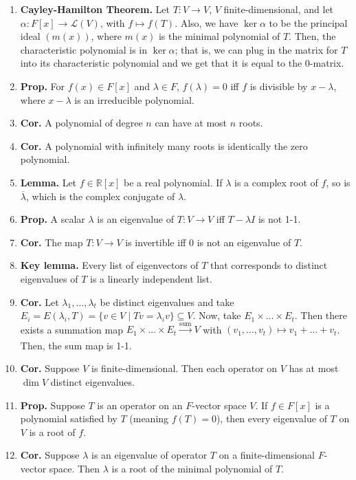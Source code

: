 \begin{enumerate}
	\item \textbf{Cayley-Hamilton Theorem. } Let $T: V \to V$, $V$ finite-dimensional, and let $\alpha: F[x] \to \mathscr{L}(V)$, with $f \mapsto f(T)$. Also, we have $\ker\alpha$ to be the principal ideal $(m(x))$, where $m(x)$ is the minimal polynomial of $T$. Then, the characteristic polynomial is in $\ker\alpha$; that is, we can plug in the matrix for $T$ into its characteristic polynomial and we get that it is equal to the 0-matrix. 
	\item \textbf{Prop. } For $f(x) \in F[x]$ and $\lambda \in F$, $f(\lambda)=0$ iff $f$ is divisible by $x - \lambda$, where $x-\lambda$ is an irreducible polynomial. 
	\item \textbf{Cor. } A polynomial of degree $n$ can have at most $n$ roots. 	
	\item \textbf{Cor. } A polynomial with infinitely many roots is identically the zero polynomial. 
	\item \textbf{Lemma. } Let $f \in \mathbb{R}[x]$ be a real polynomial. If $\lambda$ is a complex root of $f$, so is $\overline{\lambda}$, which is the complex conjugate of $\lambda$. 
	\item \textbf{Prop. } A scalar $\lambda$ is an eigenvalue of $T: V \to V$ iff $T-\lambda I$ is not 1-1. 
	\item \textbf{Cor. } The map $T: V \to V$ is invertible iff 0 is not an eigenvalue of $T$. 
	\item \textbf{Key lemma. } Every list of eigenvectors of $T$ that corresponds to distinct eigenvalues of $T$ is a linearly independent list. 
	\item \textbf{Cor. } Let $\lambda_1,\dots,\lambda_t$ be distinct eigenvalues and take $E_i = E(\lambda_i,T) = \{v \in V \mid Tv = \lambda_iv\} \subseteq V$. Now, take $E_1 \times \dots \times E_t$. Then there exists a summation map $E_1 \times \dots \times E_t \xrightarrow[]{\textrm{sum}} V$ with $(v_1,\dots,v_t) \mapsto v_1 + \dots + v_t$. Then, the sum map is 1-1. 
	\item \textbf{Cor. } Suppose $V$ is finite-dimensional. Then each operator on $V$ has at most $\dim V$ distinct eigenvalues. 
	\item \textbf{Prop. } Suppose $T$ is an operator on an $F$-vector space $V$. If $f \in F[x]$ is a polynomial satisfied by $T$ (meaning $f(T)=0$), then every eigenvalue of $T$ on $V$ is a root of $f$. 
	\item \textbf{Cor. } Suppose $\lambda$ is an eigenvalue of operator $T$ on a finite-dimensional $F$-vector space. Then $\lambda$ is a root of the minimal polynomial of $T$. 

\end{enumerate}

